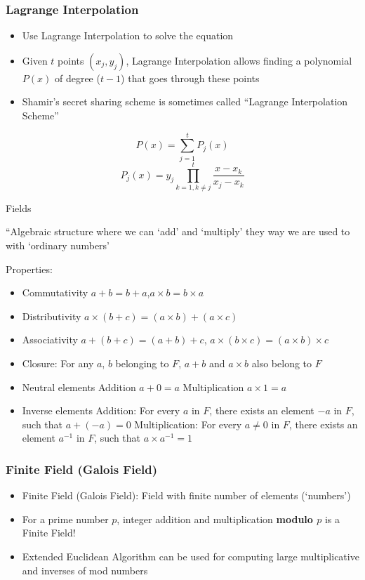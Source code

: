 \subsubsection{Lagrange Interpolation}
\begin{itemize}
	\item Use Lagrange Interpolation to solve the equation
	\item Given $t$ points $(x_j,y_j)$, Lagrange Interpolation allows finding a polynomial $P(x)$ of degree ($t-1$) that goes through these points
	\item Shamir's secret sharing scheme is sometimes called ``Lagrange Interpolation Scheme''
\end{itemize}
$$ P(x)=\sum^t_{j=1}P_j(x)$$
$$P_j(x)=y_j\prod^t_{k=1, k\neq j}\frac{x-x_k}{x_j-x_k}$$
\begin{note}{Fields}
	\begin{leftbar}
		``Algebraic structure where we can `add' and `multiply' they way we are used to with `ordinary numbers'
	\end{leftbar}
	Properties:
	\begin{itemize}
		\item Commutativity $a+b=b+a$,$a\times b=b\times a$
		\item Distributivity $a\times(b+c)=(a\times b)+(a\times c)$
		\item Associativity $a+(b+c)=(a+b)+c$, $a\times(b\times c)=(a\times b)\times c$
		\item Closure: For any $a$, $b$ belonging to $F$, $a+b$ and $a\times b$ also belong to $F$
		\item Neutral elements
		\subitem Addition $a+0=a$
		\subitem Multiplication $a\times1=a$
		\item Inverse elements
		\subitem Addition: For every $a$ in $F$, there exists an element $-a$ in $F$, such that $a+(-a)=0$
		\subitem Multiplication: For every $a\neq 0$ in $F$, there exists an element $a^{-1}$ in $F$, such that $a\times a^{-1}=1$
	\end{itemize}
\end{note}
\subsubsection{Finite Field (Galois Field)}
\begin{itemize}
	\item Finite Field (Galois Field): Field with finite number of elements (`numbers')
	\item For a prime number $p$, integer addition and multiplication \textbf{modulo $p$} is a Finite Field!
	\item Extended Euclidean Algorithm can be used for computing large multiplicative and inverses of mod numbers
\end{itemize}

